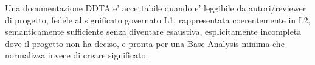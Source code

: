 \documentclass[11pt,a4paper]{article}
\begin{document}
\begin{ddtacore}[title={Final acceptance rule}]
Una documentazione DDTA e' accettabile quando e' leggibile da autori/reviewer di progetto, fedele al significato governato L1, rappresentata coerentemente in L2, semanticamente sufficiente senza diventare esaustiva, esplicitamente incompleta dove il progetto non ha deciso, e pronta per una Base Analysis minima che normalizza invece di creare significato.
\end{ddtacore}
\end{document}
